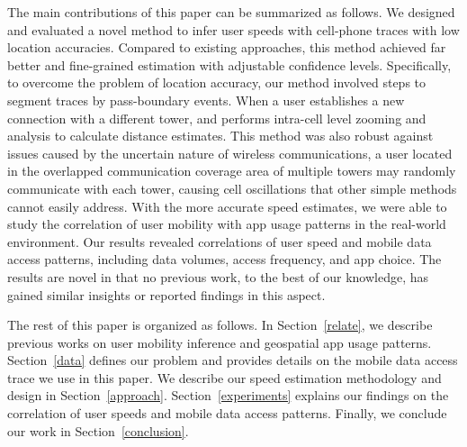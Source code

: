 The main contributions of this paper can be summarized as follows.
We designed and evaluated a novel method to infer user speeds with cell-phone traces with low location accuracies. Compared to existing approaches, this method achieved far better and fine-grained estimation with adjustable confidence levels. Specifically, to overcome the problem of location accuracy, our method involved steps to segment traces by pass-boundary events. When a user establishes a new connection with a different tower, and performs intra-cell level zooming and analysis to calculate distance estimates. This method was also robust against issues caused by the uncertain nature of wireless communications, \eg a user located in the overlapped communication coverage area of multiple towers may randomly communicate with each tower, causing cell oscillations that other simple methods cannot easily address.
With the more accurate speed estimates, we were able to study the correlation of user mobility with app usage patterns in the real-world environment. 
Our results revealed correlations of user speed and mobile data access patterns, including data volumes, access frequency, 
and app choice. 
The results are novel in that no previous work, to the best of our knowledge, has gained similar insights or reported findings in this aspect.

The rest of this paper is organized as follows.
In Section~\ref{relate}, we describe previous works on user mobility inference and geospatial app usage patterns.
Section~\ref{data} defines our problem and provides details on the mobile data access trace we use in this paper.
We describe our speed estimation methodology and design in Section~\ref{approach}.
Section~\ref{experiments} explains our findings on the correlation of user speeds and mobile data access patterns.
Finally, we conclude our work in Section~\ref{conclusion}.



